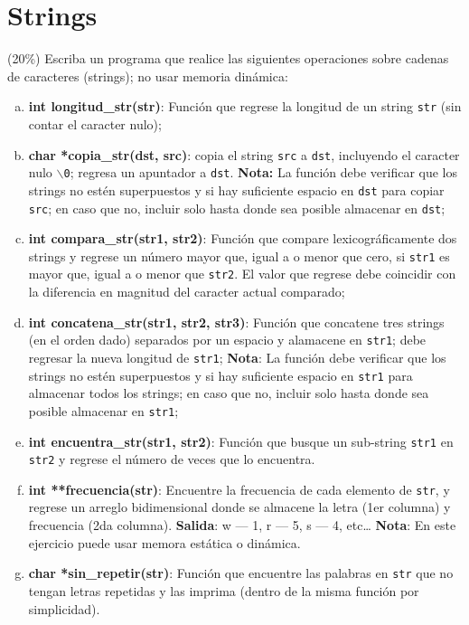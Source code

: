 \documentclass{article}
\theoremstyle{problemstyle}
\begin{document}
\section*{Strings}\label{sec:strings} %

\begin{problem}
(20\%) Escriba un programa que realice las siguientes operaciones sobre cadenas de caracteres (strings); no usar memoria din\'amica:
\begin{enumerate}[a)]
	\item \textbf{int longitud\_str(str)}: Funci\'on que regrese la longitud de un string \texttt{str} (sin contar el caracter nulo);
	\item \textbf{char *copia\_str(dst, src)}: copia el string \texttt{src} a \texttt{dst}, incluyendo el caracter nulo $\backslash$\texttt{0}; regresa un apuntador a \texttt{dst}.
	      \textbf{Nota:} La funci\'on debe verificar que los strings no est\'en superpuestos y si hay suficiente espacio en \texttt{dst} para copiar \texttt{src}; en caso que no, incluir solo hasta donde sea posible almacenar en \texttt{dst};
	\item \textbf{int compara\_str(str1, str2)}: Funci\'on que compare lexicogr\'aficamente dos strings y regrese un n\'umero mayor que, igual a o menor que cero, si \texttt{str1} es mayor que, igual a o menor que \texttt{str2}. El valor que regrese debe coincidir con la diferencia en magnitud del caracter actual comparado;
	\item \textbf{int concatena\_str(str1, str2, str3)}: Funci\'on que concatene tres strings (en el orden dado) separados por un espacio y alamacene en \texttt{str1}; debe regresar la nueva longitud de \texttt{str1};
	      \textbf{Nota}: La funci\'on debe verificar que los strings no est\'en superpuestos y si hay suficiente espacio en \texttt{str1} para almacenar todos los strings; en caso que no, incluir solo hasta donde sea posible almacenar en \texttt{str1};
	\item \textbf{int encuentra\_str(str1, str2)}: Funci\'on que busque un sub-string \texttt{str1} en \texttt{str2} y regrese el n\'umero de veces que lo encuentra.
	\item \textbf{int **frecuencia(str)}: Encuentre la frecuencia de cada elemento de \texttt{str}, y regrese un arreglo bidimensional donde se almacene la letra (1er columna) y frecuencia (2da columna).
	      \textbf{Salida}: w --- 1, r --- 5, s --- 4, etc\dots
	      \textbf{Nota}: En este ejercicio puede usar memora est\'atica o din\'amica.
	\item \textbf{char *sin\_repetir(str)}: Funci\'on que encuentre las palabras en \texttt{str} que no tengan letras repetidas y las imprima (dentro de la misma funci\'on por simplicidad).
\end{enumerate}
\end{problem}
\end{document}
